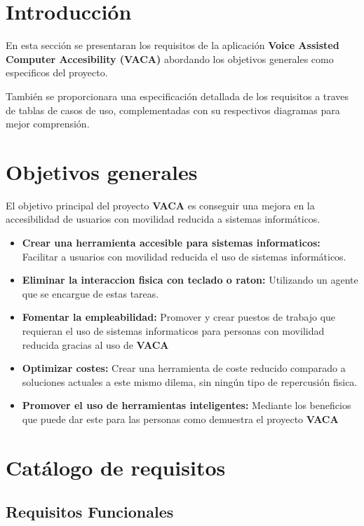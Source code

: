 
\section{Introducción}

En esta sección se presentaran los requisitos de la aplicación \textbf{Voice Assisted Computer Accesibility (VACA)} abordando los objetivos generales como especificos del proyecto.

También se proporcionara una especificación detallada de los requisitos a traves de tablas de casos de uso, complementadas con su respectivos diagramas para mejor comprensión.

\section{Objetivos generales}

El objetivo principal del proyecto \textbf{VACA} es conseguir una mejora en la accesibilidad de usuarios con movilidad reducida a sistemas informáticos.

\begin{itemize}
    \item \textbf{Crear una herramienta accesible para sistemas informaticos:} Facilitar a usuarios con movilidad reducida el uso de sistemas informáticos. 
    \item \textbf{Eliminar la interaccion fisica con teclado o raton:} Utilizando un agente que se encargue de estas tareas.
    \item \textbf{Fomentar la empleabilidad:} Promover y crear puestos de trabajo que requieran el uso de sistemas informaticos para personas con movilidad reducida gracias al uso de \textbf{VACA}
    \item \textbf{Optimizar costes:} Crear una herramienta de coste reducido comparado a soluciones actuales a este mismo dilema, sin ningún tipo de repercusión fisica.
    \item \textbf{Promover el uso de herramientas inteligentes:} Mediante los beneficios que puede dar este para las personas como demuestra el proyecto \textbf{VACA}
\end{itemize}

\section{Catálogo de requisitos}

\subsection{Requisitos Funcionales}

